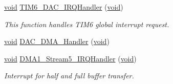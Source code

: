 \begin{DoxyCompactItemize}
\item 
\hyperlink{group___n_a_m_e_ga18028b8badbf1ea7e704ccac3c488e82}{void} \hyperlink{group___w_a_v_e_p_l_a_y_e_r___private___variables_ga0839a45f331c4c067939b9c4533bbf4d}{T\-I\-M6\-\_\-\-D\-A\-C\-\_\-\-I\-R\-Q\-Handler} (\hyperlink{group___n_a_m_e_ga18028b8badbf1ea7e704ccac3c488e82}{void})
\begin{DoxyCompactList}\small\item\em This function handles T\-I\-M6 global interrupt request. \end{DoxyCompactList}\item 
\hyperlink{group___n_a_m_e_ga18028b8badbf1ea7e704ccac3c488e82}{void} \hyperlink{group___w_a_v_e_p_l_a_y_e_r___private___variables_gacd70b474635a5b775308867bd730d64d}{D\-A\-C\-\_\-\-D\-M\-A\-\_\-\-Handler} (\hyperlink{group___n_a_m_e_ga18028b8badbf1ea7e704ccac3c488e82}{void})
\item 
\hyperlink{group___n_a_m_e_ga18028b8badbf1ea7e704ccac3c488e82}{void} \hyperlink{group___w_a_v_e_p_l_a_y_e_r___private___variables_gac201b60d58b0eba2ce0b55710eb3c4d0}{D\-M\-A1\-\_\-\-Stream5\-\_\-\-I\-R\-Q\-Handler} (\hyperlink{group___n_a_m_e_ga18028b8badbf1ea7e704ccac3c488e82}{void})
\begin{DoxyCompactList}\small\item\em Interrupt for half and full buffer transfer. \end{DoxyCompactList}\end{DoxyCompactItemize}
